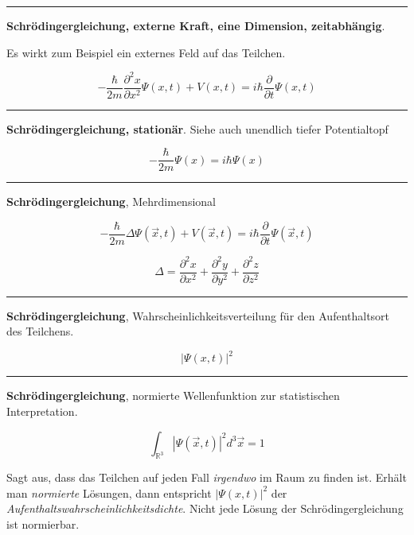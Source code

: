\documentclass{article}
\begin{document}
\hrule
\vspace{0.5cm}
\textbf{Schrödingergleichung, externe Kraft, eine Dimension, zeitabhängig}. 

Es wirkt zum Beispiel ein externes Feld auf das Teilchen. 

\begin{equation}
    -\frac{\hbar}{2m}\frac{\partial^2x}{\partial x^2}\Psi(x, t) + V(x,t) = i\hbar \frac{\partial }{\partial t}\Psi(x,t)
\end{equation}

\hrule
\vspace{0.5cm}
\textbf{Schrödingergleichung, stationär}. 
Siehe auch unendlich tiefer Potentialtopf

\begin{equation}
    -\frac{\hbar}{2m}\Psi(x) = i\hbar \Psi(x)
\end{equation}

\hrule
\vspace{0.5cm}
\textbf{Schrödingergleichung}, Mehrdimensional 

\begin{equation}
    -\frac{\hbar}{2m}\Delta\Psi(\vec{x}, t) + V(\vec{x},t) = i\hbar \frac{\partial }{\partial t}\Psi(\vec{x},t)
\end{equation}

\begin{equation}
    \Delta = \frac{\partial^2x}{\partial x^2} +\frac{\partial^2y}{\partial y^2} +\frac{\partial^2z}{\partial z^2}
\end{equation}

\hrule
\vspace{0.5cm}
\textbf{Schrödingergleichung}, Wahrscheinlichkeitsverteilung für den Aufenthaltsort des Teilchens.

\begin{equation}
    |\Psi(x,t)|^2
\end{equation}

\hrule
\vspace{0.5cm}
\textbf{Schrödingergleichung}, normierte Wellenfunktion zur statistischen Interpretation.

\begin{equation}
    \int_{\mathbb{R}^3} |\Psi(\vec{x},t)|^2 d^3\vec{x} = 1
\end{equation}

Sagt aus, dass das Teilchen auf jeden Fall \textit{irgendwo} im Raum zu finden ist.
Erhält man \textit{normierte} Lösungen, dann entspricht $|\Psi(x,t)|^2$ der \textit{Aufenthaltswahrscheinlichkeitsdichte}.
Nicht jede Lösung der Schrödingergleichung ist normierbar. 
\end{document}
